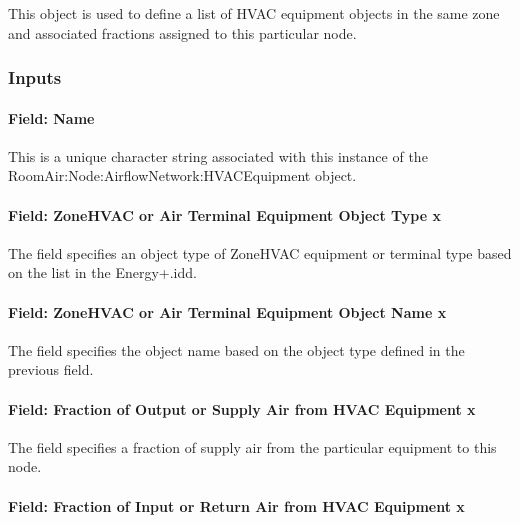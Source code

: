 This object is used to define a list of HVAC equipment objects in the same zone and associated fractions assigned to this particular node.

\subsubsection{Inputs}\label{inputs-15-012}

\paragraph{Field: Name}\label{field-name-11-012}

This is a unique character string associated with this instance of the Room\-Air:\-Node:\-Air\-flow\-Net\-work:\-HVAC\-Equipment object.

\paragraph{Field: ZoneHVAC or Air Terminal Equipment Object Type x}\label{field-zonehvac-or-air-terminal-equipment-object-type-x}

The field specifies an object type of ZoneHVAC equipment or terminal type based on the list in the Energy+.idd.

\paragraph{Field: ZoneHVAC or Air Terminal Equipment Object Name x}\label{field-zonehvac-or-air-terminal-equipment-object-name-x}

The field specifies the object name based on the object type defined in the previous field.

\paragraph{Field: Fraction of Output or Supply Air from HVAC Equipment x}\label{field-fraction-of-output-or-supply-air-from-hvac-equipment-x}

The field specifies a fraction of supply air from the particular equipment to this node.

\paragraph{Field: Fraction of Input or Return Air from HVAC Equipment x}\label{field-fraction-of-input-or-return-air-from-hvac-equipment-x}

